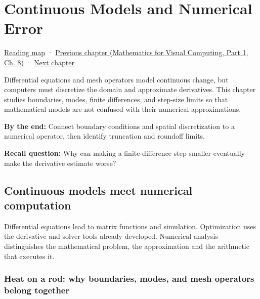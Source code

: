 \chapter{Continuous Models and Numerical Error}\label{02-foundations-ii-ch025-continuous-models-and-numerical-error}\hypertarget{02-foundations-ii-ch025}{}\label{stagechapter:02-foundations-ii-ch025}

\hypertarget{02-foundations-ii-ch025-continuous-models-and-numerical-error}{}

\hyperref[volume-reading-map]{Reading map} · \href{../02-Mathematics-for-Visual-Computing-P01/main.pdf\#02-foundations-ii-ch024-waiting-times-covariance-and-matrix-decomposition}{Previous chapter (Mathematics for Visual Computing, Part 1, Ch. 8)} · \hyperref[02-foundations-ii-ch026-matrix-functions-and-nonlinear-least-squares]{Next chapter}

Differential equations and mesh operators model continuous change, but computers must discretize the domain and approximate derivatives. This chapter studies boundaries, modes, finite differences, and step-size limits so that mathematical models are not confused with their numerical approximations.

\textbf{By the end:} Connect boundary conditions and spatial discretization to a numerical operator, then identify truncation and roundoff limits.

\textbf{Recall question:} Why can making a finite-difference step smaller eventually make the derivative estimate worse?

\section{Continuous models meet numerical computation}\label{02-foundations-ii-ch025-continuous-models-meet-numerical-computation}

\hypertarget{02-foundations-ii-ch025-continuous-models-meet-numerical-computation}{}

Differential equations lead to matrix functions and simulation. Optimization uses the derivative and solver tools already developed. Numerical analysis distinguishes the mathematical problem, the approximation and the arithmetic that executes it.

\subsection{Heat on a rod: why boundaries, modes, and mesh operators belong together}\label{02-foundations-ii-ch025-heat-on-a-rod-why-boundaries-modes-and-mesh-operators-belong-together}

